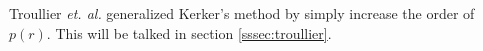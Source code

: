 Troullier \emph{et. al.} generalized Kerker's method by simply increase
the order of $p (r)$.\cite{troullier1990straightforward}
This will be talked in section \ref{sssec:troullier}.














